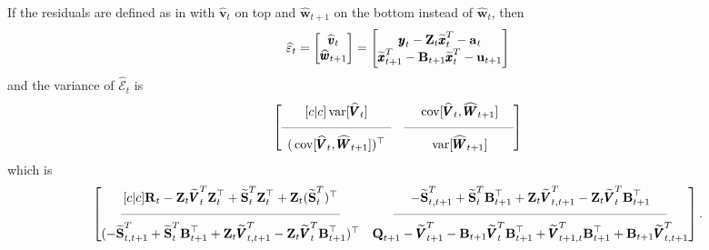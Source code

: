 \documentclass[]{article}
\def\UPS{\mbox{\boldmath $\Upsilon$}}
\def\XI{\mbox{\boldmath $\Xi$}}
\def\BB{\mbox{$\mathbf B$}}	\def\bb{\mbox{$\mathbf b$}} \def\Bb{\mbox{$\mathbf J$}} \def\Ba{\mbox{$\mathbf L$}} \def\Bm{\UPS}
\def\QQ{\mbox{$\mathbf Q$}}	 \def\qq{\mbox{$\mathbf q$}} \def\Qb{\mbox{$\mathbf G$}}  \def\Qm{\mathbb{Q}}
\def\RR{\mbox{$\mathbf R$}}	 \def\rr{\mbox{$\mathbf r$}} \def\Rb{\mbox{$\mathbf H$}}	\def\Rm{\mathbb{R}}
\def\Ss{\mbox{$\mathbf S$}}
\def\VV{\mbox{$\pmb{V}$}}	\def\vv{\mbox{$\pmb{v}$}}
\def\WW{\mbox{$\pmb{W}$}}	\def\ww{\mbox{$\pmb{w}$}}
\def\ZZ{\mbox{$\mathbf Z$}}	\def\zz{\mbox{$\mathbf z$}}	\def\Zb{\mbox{$\mathbf M$}} \def\Za{\mbox{$\mathbf N$}} \def\Zm{\XI}
\def\var{\,\textup{\textrm{var}}}
\def\cov{\,\textup{\textrm{cov}}}
\def\hatxtT{\widetilde{\xx}_t^T}
\def\hatxtpT{\widetilde{\xx}_{t+1}^T}
\def\hatWtp{\widehat{\WW}_{t+1}}
\def\hatwt{\widehat{\ww}_t}
\def\hatwtp{\widehat{\ww}_{t+1}}
\def\hatVt{\widehat{\VV}_t}
\def\hatvt{\widehat{\vv}_t}
\def\hatVtT{\widetilde{\VV}_t^T}
\def\hatVtpT{\widetilde{\VV}_{t+1}^T}
\def\hatVttpT{\widetilde{\VV}_{t,t+1}^T}
\def\hatVtptT{\widetilde{\VV}_{t+1,t}^T}
\def\hatStT{\widetilde{\Ss}_t^T}
\def\hatSttpT{\widetilde{\Ss}_{t,t+1}^T}
\begin{document}
If the residuals are defined as in \citet{Harveyetal1998} with $\hatvt$ on top and $\hatwtp$ on the bottom instead of $\hatwt$, then
\begin{equation}
\widehat{\varepsilon}_t = \begin{bmatrix}\hatvt\\ \hatwtp \end{bmatrix} =
\begin{bmatrix}\yy_t - \ZZ_t\hatxtT - \aa_t\\ \hatxtpT - \BB_{t+1}\hatxtT - \uu_{t+1} \end{bmatrix}
\end{equation}
and the variance of $\widehat{\mathcal{E}}_t$ is
\begin{equation}
 \begin{bmatrix}[c|c]
 \var[\hatVt]&
 \cov[\hatVt, \hatWtp] \\
 \rule[.5ex]{20ex}{0.25pt} & \rule[.5ex]{20ex}{0.25pt} \\
 (\cov[\hatVt, \hatWtp])^\top& 
 \var[\hatWtp] \end{bmatrix}
\end{equation}
which is
\begin{equation}\label{eq:jointcondresid2}
\begin{bmatrix}[c|c]
\RR_t - \ZZ_t\hatVtT\ZZ_t^\top + \hatStT\ZZ_t^\top + \ZZ_t(\hatStT)^\top&
- \hatSttpT + \hatStT\BB_{t+1}^\top + \ZZ_t\hatVttpT - \ZZ_t\hatVtT\BB_{t+1}^\top \\
\rule[.5ex]{40ex}{0.25pt} & \rule[.5ex]{50ex}{0.25pt} \\
(- \hatSttpT + \hatStT\BB_{t+1}^\top + \ZZ_t\hatVttpT - \ZZ_t\hatVtT\BB_{t+1}^\top)^\top& 
\QQ_{t+1} - \hatVtpT - \BB_{t+1}\hatVtT\BB_{t+1}^\top + \hatVtptT \BB_{t+1}^\top + \BB_{t+1}\hatVttpT \end{bmatrix} .
\end{equation}
\end{document}
